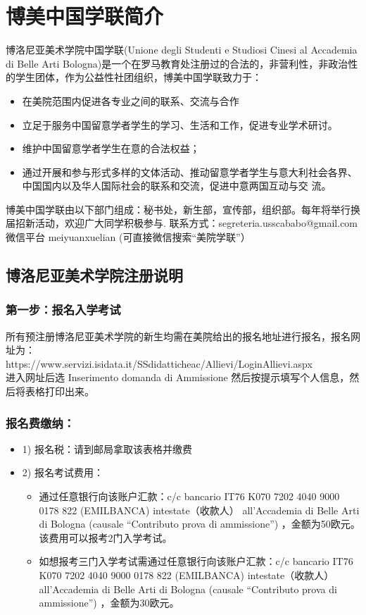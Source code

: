 \documentclass[3pt,a5paper,openright,twoside]{book}
\begin{document}
\section{博美中国学联简介}

博洛尼亚美术学院中国学联(Unione degli Studenti e Studiosi Cinesi al Accademia di Belle Arti Bologna)是一个在罗马教育处注册过的合法的，非营利性，非政治性的学生团体，作为公益性社团组织，博美中国学联致力于：
\begin{itemize}
\item 在美院范围内促进各专业之间的联系、交流与合作
\item 立足于服务中国留意学者学生的学习、生活和工作，促进专业学术研讨。
\item 维护中国留意学者学生在意的合法权益；
\item 通过开展和参与形式多样的文体活动、推动留意学者学生与意大利社会各界、中国国内以及华人国际社会的联系和交流，促进中意两国互动与交 流。
\end{itemize}

博美中国学联由以下部门组成：秘书处，新生部，宣传部，组织部。每年将举行换届招新活动，欢迎广大同学积极参与.
联系方式：segreteria.usscababo@gmail.com
微信平台  meiyuanxuelian (可直接微信搜索“美院学联”）

\subsection{博洛尼亚美术学院注册说明}
\subsubsection{第一步：报名入学考试}
所有预注册博洛尼亚美术学院的新生均需在美院给出的报名地址进行报名，报名网址为：\\
https://www.servizi.isidata.it/SSdidatticheac/Allievi/LoginAllievi.aspx\\ 
进入网址后选 Inserimento domanda di Ammissione 然后按提示填写个人信息，然后将表格打印出来。


\subsubsection{报名费缴纳：}
\begin{itemize}
\item 1) 报名税：请到邮局拿取该表格并缴费
\item 2) 报名考试费用：
          \begin{itemize}
                  \item 通过任意银行向该账户汇款：c/c bancario IT76 K070 7202 4040 9000 0178 822 (EMILBANCA)  intestate（收款人） all’Accademia di Belle Arti di Bologna (causale “Contributo prova di ammissione”) ，金额为50欧元。该费用可以报考2门入学考试。
                  \item  如想报考三门入学考试需通过任意银行向该账户汇款：c/c bancario IT76 K070 7202 4040 9000 0178 822 (EMILBANCA)  intestate（收款人） all’Accademia di Belle Arti di Bologna (causale “Contributo prova di ammissione”) ，金额为30欧元。
          \end{itemize}
\end{itemize}
\end{document}
